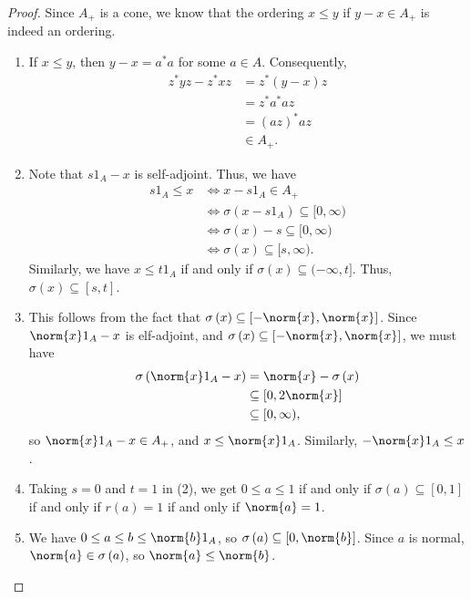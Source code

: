 \documentclass[10pt]{mypackage}
\begin{document}
\begin{proof}
  Since $A_{+}$ is a cone, we know that the ordering $x\leq y$ if $y-x\in A_{+}$ is indeed an ordering.
  \begin{enumerate}[(1)]
    \item If $x\leq y$, then $y-x = a^{\ast}a$ for some $a\in A$. Consequently,
      \begin{align*}
        z^{\ast}yz - z^{\ast}xz &= z^{\ast}\left(y-x\right)z\\
                                &= z^{\ast}a^{\ast}az\\
                                &= \left(az\right)^{\ast}az\\
                                &\in A_{+}.
      \end{align*}
    \item Note that $s1_A - x$ is self-adjoint. Thus, we have
      \begin{align*}
        s1_A \leq x &\Leftrightarrow x-s1_A \in A_{+}\\
                    &\Leftrightarrow \sigma\left(x-s1_A\right)\subseteq [0,\infty)\\
                    &\Leftrightarrow \sigma\left(x\right)-s \subseteq [0,\infty)\\
                    &\Leftrightarrow \sigma\left(x\right)\subseteq [s,\infty).
      \end{align*}
      Similarly, we have $x\leq t1_A$ if and only if $\sigma\left(x\right)\subseteq (-\infty,t]$. Thus, $\sigma\left(x\right)\subseteq [s,t]$.
    \item This follows from the fact that $\sigma\left(x\right)\subseteq \left[-\norm{x},\norm{x}\right]$. Since $\norm{x}1_A - x$ is elf-adjoint, and $\sigma\left(x\right)\subseteq \left[-\norm{x},\norm{x}\right]$, we must have
      \begin{align*}
        \sigma\left(\norm{x}1_A - x\right) &= \norm{x}-\sigma\left(x\right)\\
                                           &\subseteq [0,2\norm{x}]\\
                                           &\subseteq [0,\infty),
      \end{align*}
      so $\norm{x}1_A - x \in A_{+}$, and $x\leq \norm{x}1_A$. Similarly, $-\norm{x}1_A \leq x$.
    \item Taking $s  = 0$ and $t = 1$ in (2), we get $0 \leq a \leq 1$ if and only if $\sigma\left(a\right)\subseteq [0,1]$ if and only if $r(a) = 1$ if and only if $\norm{a} = 1$.
    \item We have $ 0\leq a \leq b \leq \norm{b}1_A $, so $\sigma\left(a\right)\subseteq [0,\norm{b}]$. Since $a$ is normal, $\norm{a}\in \sigma\left(a\right)$, so $\norm{a}\leq \norm{b}$.

\end{enumerate}
\end{proof}
\end{document}
